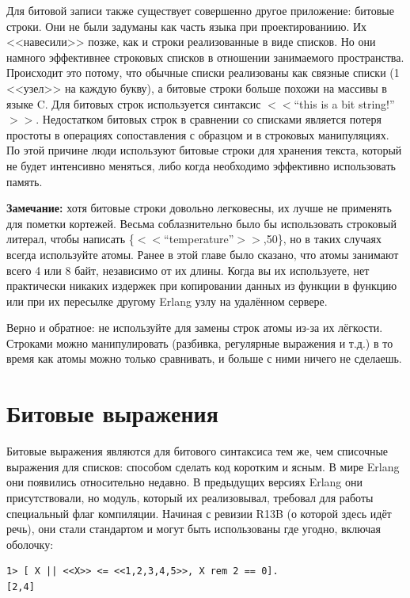 \documentclass[a4paper,12pt]{report}
\newcommand{\ops}{\colorbox{lgreen}}
\begin{document}
Для битовой записи также существует совершенно другое приложение: битовые строки. Они не были задуманы как часть языка при проектированиию. Их <<навесили>> позже, как и строки реализованные в виде списков. Но они намного эффективнее строковых списков в отношении занимаемого пространства. Происходит это потому, что обычные списки реализованы как связные списки (1 <<узел>> на каждую букву), а битовые строки больше похожи на массивы в языке C. Для битовых строк используется синтаксис \ops{$<<$``this is a bit string!''$>>$}. Недостатком битовых строк в сравнении со списками является потеря простоты в операциях сопоставления с образцом и в строковых манипуляциях. По этой причине люди используют битовые строки для хранения текста, который не будет интенсивно меняться, либо когда необходимо эффективно использовать память.\\ 
\colorbox{lgray}{
    \begin{minipage}{\linewidth}
        \textbf{Замечание:} хотя битовые строки довольно легковесны, их лучше не применять для пометки кортежей. Весьма соблазнительно было бы использовать строковый литерал, чтобы написать \ops{\{$<<$``temperature''$>>$,50\}}, но в таких случаях всегда используйте атомы. Ранее в этой главе было сказано, что атомы занимают всего 4 или 8 байт, независимо от их длины. Когда вы их используете, нет практически никаких издержек при копировании данных из функции в функцию или при их пересылке другому Erlang узлу на удалённом сервере.
        
        Верно и обратное: не используйте для замены строк атомы из\--за их лёгкости. Строками можно манипулировать (разбивка, регулярные выражения и т.д.) в то время как атомы можно только сравнивать, и больше с ними ничего не сделаешь.
    \end{minipage}
}
\section{Битовые выражения}
Битовые выражения являются для битового синтаксиса тем же, чем списочные выражения для списков: способом сделать код коротким и ясным. В мире Erlang они появились относительно недавно. В предыдущих версиях Erlang они присутствовали, но модуль, который их реализовывал, требовал для работы специальный флаг компиляции. Начиная с ревизии R13B (о которой здесь идёт речь), они стали стандартом и могут быть использованы где угодно, включая оболочку:
\begin{lstlisting}[style=repl]
1> [ X || <<X>> <= <<1,2,3,4,5>>, X rem 2 == 0].    
[2,4]
\end{lstlisting}
\end{document}
